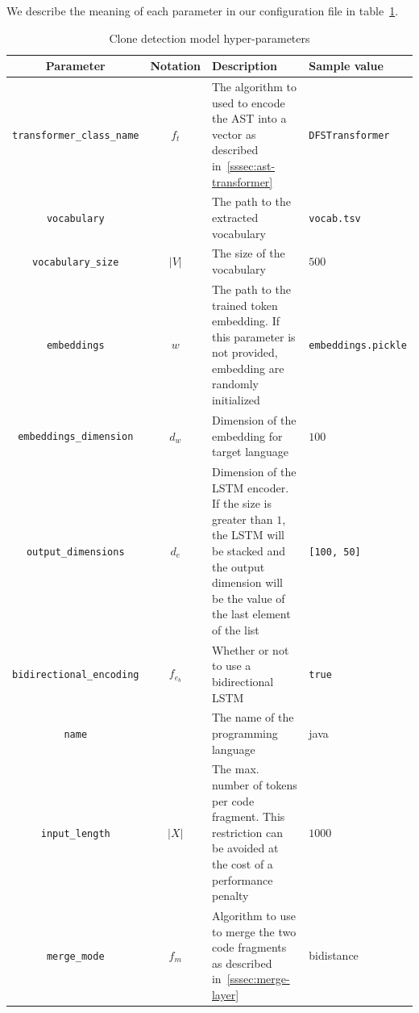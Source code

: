 \begin{figure}
  
\end{figure}

We describe the meaning of each parameter in our configuration file in
table~\ref{tab:hyper-parameters}.

\begin{table}[p]
  \caption{\label{tab:hyper-parameters}Clone detection model hyper-parameters}
  \begin{center}
    \begin{tabularx}{\linewidth}{c c X l}
      \toprule
      Parameter & Notation & Description & Sample value\\
      \toprule
      \lstinline{transformer_class_name} & $f_t$ & The algorithm to used to encode
      the AST into a vector as described in~\ref{sssec:ast-transformer} & \lstinline{DFSTransformer}\\
      \lstinline{vocabulary} & & The path to the extracted vocabulary & \lstinline{vocab.tsv}\\
      \lstinline{vocabulary_size} & $|V|$ & The size of the vocabulary & $500$\\
      \lstinline{embeddings} & $w$ & The path to the trained token embedding. If
      this parameter is not provided, embedding are randomly initialized & \lstinline{embeddings.pickle}\\
      \lstinline{embeddings_dimension} & $d_w$ & Dimension of the embedding for
      target language & $100$\\
      \lstinline{output_dimensions} & $d_e$ & Dimension of the
      LSTM encoder. If the size is greater than $1$, the LSTM will be stacked
      and the output dimension will be the value of the last element of the list
      & \lstinline{[100, 50]}\\
      \lstinline{bidirectional_encoding} & $f_{e_b}$ & Whether or not to use a
      bidirectional LSTM & \lstinline{true}\\
      \lstinline{name} & & The name of the programming language & java\\
      \lstinline{input_length} & $|X|$ & The max. number of tokens per code
      fragment. This restriction can be avoided at the cost of a performance
      penalty & $1000$\\
      \lstinline{merge_mode} & $f_m$ & Algorithm to use to merge the two code
      fragments as described in~\ref{sssec:merge-layer} & bidistance
    \end{tabularx}
  \end{center}
\end{table}
